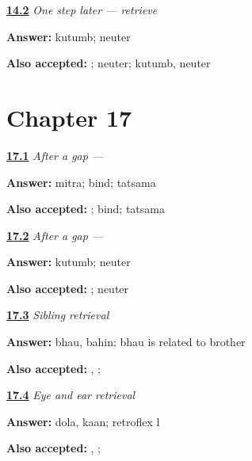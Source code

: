 \noindent\begin{minipage}[t]{\linewidth}
\raggedright
\hyperlink{review-MR-R11-kutumb-r1-check}{\textbf{14.2}} \emph{One step later — retrieve }\par
\small \textbf{Answer:} kutumb; neuter\par
\footnotesize \textbf{Also accepted:} ; neuter; kutumb, neuter
\end{minipage}\par\medskip

\section*{Chapter 17}

\noindent\begin{minipage}[t]{\linewidth}
\raggedright
\hyperlink{review-MR-R14-mitra-r2-check}{\textbf{17.1}} \emph{After a gap — }\par
\small \textbf{Answer:} mitra; bind; tatsama\par
\footnotesize \textbf{Also accepted:} ; bind; tatsama
\end{minipage}\par\medskip

\noindent\begin{minipage}[t]{\linewidth}
\raggedright
\hyperlink{review-MR-R14-kutumb-r2-check}{\textbf{17.2}} \emph{After a gap — }\par
\small \textbf{Answer:} kutumb; neuter\par
\footnotesize \textbf{Also accepted:} ; neuter
\end{minipage}\par\medskip

\noindent\begin{minipage}[t]{\linewidth}
\raggedright
\hyperlink{review-MR-R14-siblings-check}{\textbf{17.3}} \emph{Sibling retrieval}\par
\small \textbf{Answer:} bhau, bahin; bhau is related to brother\par
\footnotesize \textbf{Also accepted:} , ; 
\end{minipage}\par\medskip

\noindent\begin{minipage}[t]{\linewidth}
\raggedright
\hyperlink{review-MR-R14-eye-ear-check}{\textbf{17.4}} \emph{Eye and ear retrieval}\par
\small \textbf{Answer:} dola, kaan; retroflex l\par
\footnotesize \textbf{Also accepted:} , ; 
\end{minipage}\par\medskip

